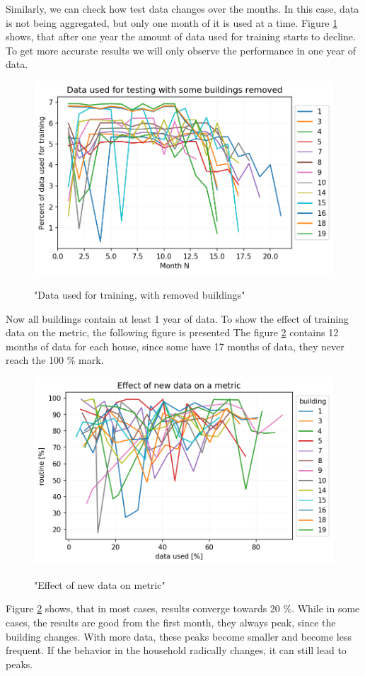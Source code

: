 Similarly, we can check how test data changes over the months. In this case,
data is not being aggregated, but only one month of it is used at a time.
Figure \ref{fig:data_used_for_testing} shows, that after one year
the amount of data used for training starts to decline. 
To get more accurate results we will only observe the performance in one year of data. 

\begin{figure}[H]
	\centering
	\caption{"Data used for training, with removed buildings"}
	\includegraphics[width=.7\textwidth]{Figures/EC/DYN/data_used_for_testing.png}
	\label{fig:data_used_for_testing}
\end{figure}

Now all buildings contain at least 1 year of data. 
To show the effect of training data on the metric, the following figure is presented
The figure \ref{fig:efect_of_data_on_metric} contains 12 months of 
data for each house, since some have 17 months of data,
they never reach the 100 \% mark.

\begin{figure}[H]
	\centering
	\caption{"Effect of new data on metric"}
	\includegraphics[width=.7\textwidth]{Figures/EC/DYN/efect_of_data_on_metric.png}
	\label{fig:efect_of_data_on_metric}
\end{figure}

Figure \ref{fig:efect_of_data_on_metric} shows, that in most cases, results converge
towards 20 \%. While in some cases, the results are good from the first month,
they always peak, since the building changes. With more data, these peaks become smaller
and become less frequent. If the behavior in the household radically changes, it can
still lead to peaks.

